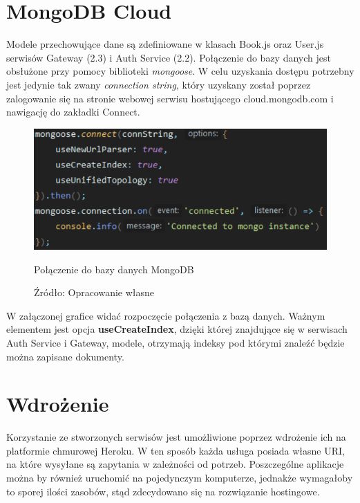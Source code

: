 \newpage
\section{MongoDB Cloud}
Modele przechowujące dane są zdefiniowane w klasach Book.js oraz User.js serwisów Gateway (2.3) i Auth Service (2.2). Połączenie do bazy danych jest obsłużone przy pomocy biblioteki \textit{mongoose}.\newline
W celu uzyskania dostępu potrzebny jest jedynie tak zwany \textit{connection string}, który uzyskany został poprzez zalogowanie się na stronie webowej serwisu hostującego cloud.mongodb.com i nawigację do zakładki Connect.
\begin{figure}[H]
	\centering
	\includegraphics[width=\linewidth]{mongo.pdf}
	\caption{\centering Połączenie do bazy danych MongoDB}
	\caption*{\centering Źródło: {Opracowanie własne}}
\end{figure}
W załączonej grafice widać rozpoczęcie połączenia z bazą danych. Ważnym elementem jest opcja \textbf{useCreateIndex}, dzięki której znajdujące się w serwisach Auth Service i Gateway, modele, otrzymają indeksy pod którymi znaleźć będzie można zapisane dokumenty. 


\section{Wdrożenie}

Korzystanie ze stworzonych serwisów jest umożliwione poprzez wdrożenie ich na platformie chmurowej Heroku.
W ten sposób każda usługa posiada własne URI, na które wysyłane są zapytania w zależności od potrzeb.
Poszczególne aplikacje można by również uruchomić na pojedynczym komputerze, jednakże wymagałoby to sporej ilości zasobów, stąd zdecydowano się na rozwiązanie hostingowe.


